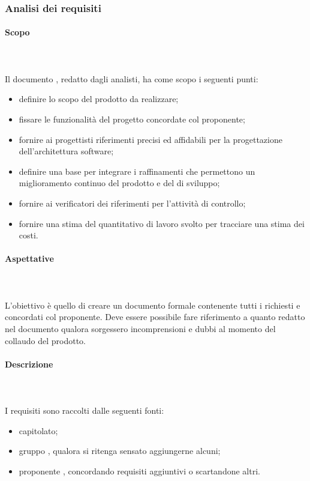 \subsubsection{Analisi dei requisiti}
\paragraph{Scopo}\mbox{}\\ \\
Il documento \AdR{}, redatto dagli analisti, ha come scopo i seguenti punti:
\begin{itemize}
\item definire lo scopo del prodotto da realizzare;
\item fissare le funzionalità del progetto concordate col proponente;
\item fornire ai progettisti riferimenti precisi ed affidabili per la progettazione dell'architettura software;
\item definire una base per integrare i raffinamenti che permettono un miglioramento continuo del prodotto e del  di sviluppo;
\item fornire ai verificatori dei riferimenti per l’attività di controllo;
\item fornire una stima del quantitativo di lavoro svolto per tracciare una stima dei costi. 
\end{itemize}

\paragraph{Aspettative}\mbox{}\\ \\
L'obiettivo è quello di creare un documento formale contenente tutti i  richiesti e concordati col proponente.
Deve essere possibile fare riferimento a quanto redatto nel documento \AdR{} qualora sorgessero incomprensioni e dubbi al momento del collaudo del prodotto.

\paragraph{Descrizione}\mbox{}\\ \\
I requisiti sono raccolti dalle seguenti fonti:
\begin{itemize}
\item capitolato;
\item gruppo \Gruppo{}, qualora si ritenga sensato aggiungerne alcuni;
\item proponente \Proponente{}, concordando requisiti aggiuntivi o scartandone altri.
\end{itemize}

